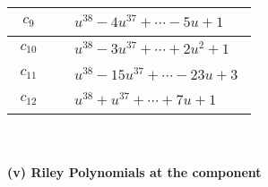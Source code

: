 \documentclass[1p]{elsarticle_modified}
\theoremstyle{definition}
\begin{document}
\begin{tabular}{m{50pt}|m{274pt}}
\hline $$\begin{aligned}c_{9}\end{aligned}$$&$\begin{aligned}
&u^{38}-4 u^{37}+\cdots-5 u+1
\end{aligned}$\\
\hline $$\begin{aligned}c_{10}\end{aligned}$$&$\begin{aligned}
&u^{38}-3 u^{37}+\cdots+2 u^2+1
\end{aligned}$\\
\hline $$\begin{aligned}c_{11}\end{aligned}$$&$\begin{aligned}
&u^{38}-15 u^{37}+\cdots-23 u+3
\end{aligned}$\\
\hline $$\begin{aligned}c_{12}\end{aligned}$$&$\begin{aligned}
&u^{38}+u^{37}+\cdots+7 u+1
\end{aligned}$\\
\hline
\end{tabular}\\~\\
\newpage\renewcommand{\arraystretch}{1}
\flushleft \textbf{(v) Riley Polynomials at the component}\newline \\
\end{document}
